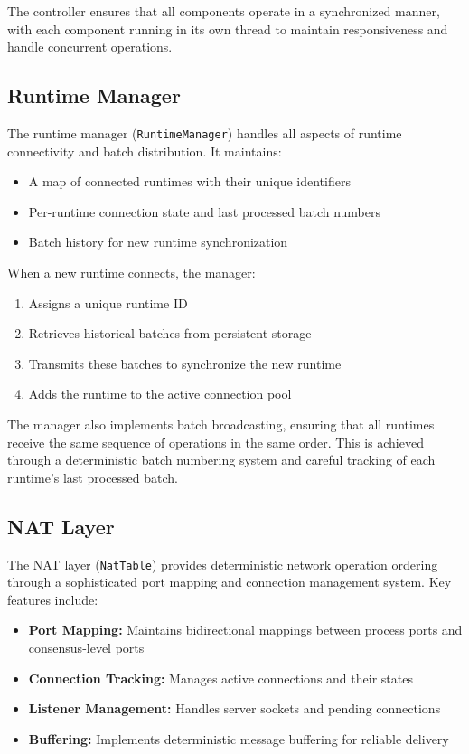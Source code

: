 \documentclass[10pt, 
]{IEEEtran}
\begin{document}
The controller ensures that all components operate in a synchronized manner, with each component running in its own thread to maintain responsiveness and handle concurrent operations.

\subsection{Runtime Manager}

The runtime manager (\texttt{RuntimeManager}) handles all aspects of runtime connectivity and batch distribution. It maintains:

\begin{itemize}
    \item A map of connected runtimes with their unique identifiers
    \item Per-runtime connection state and last processed batch numbers
    \item Batch history for new runtime synchronization
\end{itemize}

When a new runtime connects, the manager:
\begin{enumerate}
    \item Assigns a unique runtime ID
    \item Retrieves historical batches from persistent storage
    \item Transmits these batches to synchronize the new runtime
    \item Adds the runtime to the active connection pool
\end{enumerate}

The manager also implements batch broadcasting, ensuring that all runtimes receive the same sequence of operations in the same order. This is achieved through a deterministic batch numbering system and careful tracking of each runtime's last processed batch.

\subsection{NAT Layer}

The NAT layer (\texttt{NatTable}) provides deterministic network operation ordering through a sophisticated port mapping and connection management system. Key features include:

\begin{itemize}
    \item \textbf{Port Mapping:} Maintains bidirectional mappings between process ports and consensus-level ports
    \item \textbf{Connection Tracking:} Manages active connections and their states
    \item \textbf{Listener Management:} Handles server sockets and pending connections
    \item \textbf{Buffering:} Implements deterministic message buffering for reliable delivery
\end{itemize}
\end{document}
